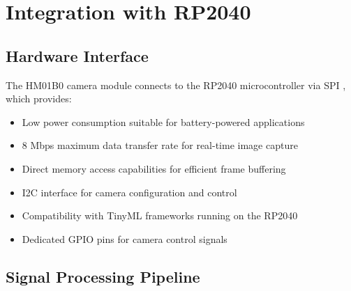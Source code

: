 \section{Integration with RP2040}



\subsection{Hardware Interface}



The HM01B0 camera module connects to the RP2040 microcontroller via SPI \cite{Arducam:2023, Himax:2019}, which provides:



\begin{itemize}
    
    
    
    \item Low power consumption suitable for battery-powered applications
    
    
    
    \item 8 Mbps maximum data transfer rate for real-time image capture
    
    
    
    \item Direct memory access capabilities for efficient frame buffering
    
    
    
    \item I2C interface for camera configuration and control
    
    
    
    \item Compatibility with TinyML frameworks running on the RP2040
    
    
    
    \item Dedicated GPIO pins for camera control signals
    
    
    
\end{itemize}







\subsection{Signal Processing Pipeline}



